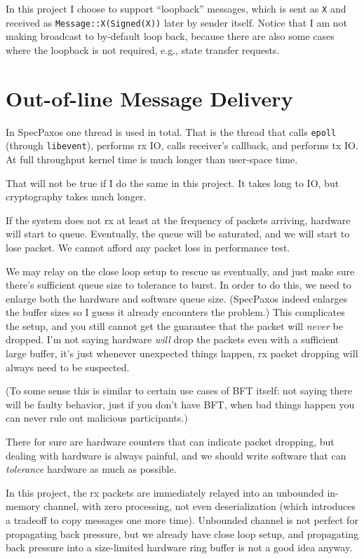 \documentclass[acmsmall, nonacm, screen]{acmart}
\begin{document}
In this project I choose to support ``loopback'' messages, which is sent as \texttt{X} and received as \texttt{Message::X(Signed(X))} later by sender itself.
Notice that I am not making broadcast to by-default loop back, because there are also some cases where the loopback is not required, e.g., state transfer requests.

\section{Out-of-line Message Delivery}

In SpecPaxos one thread is used in total.
That is the thread that calls \texttt{epoll} (through \texttt{libevent}), performs rx IO, calls receiver's callback, and performs tx IO.
At full throughput kernel time is much longer than user-space time.

That will not be true if I do the same in this project.
It takes long to IO, but cryptography takes much longer.

If the system does not rx at least at the frequency of packets arriving, hardware will start to queue.
Eventually, the queue will be saturated, and we will start to lose packet.
We cannot afford any packet loss in performance test.

We may relay on the close loop setup to rescue us eventually, and just make sure there's sufficient queue size to tolerance to burst.
In order to do this, we need to enlarge both the hardware and software queue size.
(SpecPaxos indeed enlarges the buffer sizes so I guess it already encounters the problem.)
This complicates the setup, and you still cannot get the guarantee that the packet will \emph{never} be dropped.
I'm not saying hardware \emph{will} drop the packets even with a sufficient large buffer, it's just whenever unexpected things happen, rx packet dropping will always need to be suspected.

(To some sense this is similar to certain use cases of BFT itself: not saying there will be faulty behavior, just if you don't have BFT, when bad things happen you can never rule out malicious participants.)

There for sure are hardware counters that can indicate packet dropping, but dealing with hardware is always painful, and we should write software that can \emph{tolerance} hardware as much as possible.

In this project, the rx packets are immediately relayed into an unbounded in-memory channel, with zero processing, not even deserialization (which introduces a tradeoff to copy messages one more time).
Unbounded channel is not perfect for propagating back pressure, but we already have close loop setup, and propagating back pressure into a size-limited hardware ring buffer is not a good idea anyway.
\end{document}
